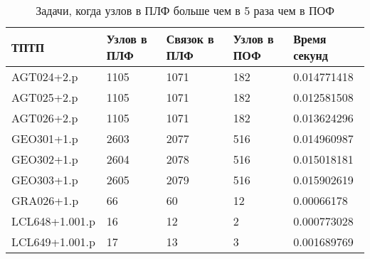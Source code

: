 \documentclass[a4paper]{jctart15b}
\begin{document}
\begin{table}[htbp]
	\caption{Задачи, когда узлов в ПЛФ больше чем в 5 раза чем в ПОФ}\vspace*{2mm}
	\begin{tabular}{|l|l|l|l|l|}
		\hline
		\textbf{ТПТП} & \textbf{Узлов в ПЛФ} & \textbf{Связок в ПЛФ} & \textbf{Узлов в ПОФ} & \textbf{Время секунд} \\
		\hline
		AGT024+2.p & 1105 & 1071 & 182 & 0.014771418 \\
		\hline
		AGT025+2.p & 1105 & 1071 & 182 & 0.012581508 \\
		\hline
		AGT026+2.p & 1105 & 1071 & 182 & 0.013624296 \\
		\hline
		GEO301+1.p & 2603 & 2077 & 516 & 0.014960987 \\
		\hline
		GEO302+1.p & 2604 & 2078 & 516 & 0.015018181 \\
		\hline
		GEO303+1.p & 2605 & 2079 & 516 & 0.015902619 \\
		\hline
		GRA026+1.p & 66 & 60 & 12 & 0.00066178 \\
		\hline
		LCL648+1.001.p & 16 & 12 & 2 & 0.000773028 \\
		\hline
		LCL649+1.001.p & 17 & 13 & 3 & 0.001689769 \\
		\hline
		
	\end{tabular}
\end{table}
\end{document}

